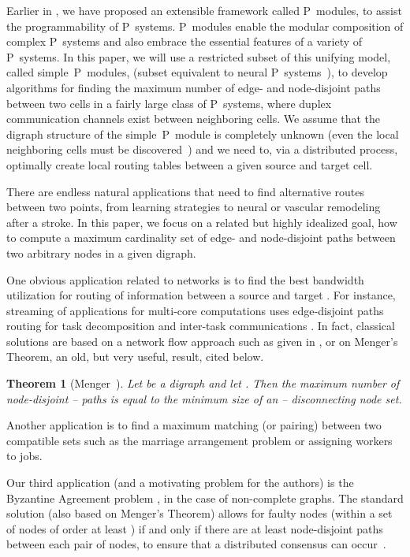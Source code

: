 \documentclass[preliminary,copyright,creativecommons]{eptcs}
\newtheorem{theorem}{Theorem}
\theoremstyle{remark}
\begin{document}
Earlier in \cite{DKN-JLAP2010}, we have proposed an extensible framework 
called P~modules, to assist the programmability of P~systems.
P~modules enable the modular composition of complex P~systems
and also embrace the essential features of a variety of P~systems.
In this paper, we will use a restricted subset of this unifying model,
called simple~P~modules,
(subset equivalent to neural P~systems~\cite{MartinVidePPR2003}),
to develop algorithms for finding the maximum number of edge- and node-disjoint paths
between two cells in a fairly large class of P~systems, where 
duplex communication channels exist between neighboring cells.  
We assume that the digraph structure of the simple~P~module is completely unknown
(even the local neighboring cells must be discovered~\cite{NDK-WMC2009}) 
and we need to, via a distributed process, optimally create local routing tables 
between a given source and target cell.

There are endless natural applications that need to find alternative
routes between two points, from learning strategies to
neural or vascular remodeling after a stroke.
In this paper, we focus on a related but highly idealized goal, 
how to compute a maximum cardinality set of edge- and node-disjoint paths 
between two arbitrary nodes in a given digraph.

One obvious application related to networks is to find the best 
bandwidth utilization for routing of information between a 
source and target \cite{Robacker56}.  
For instance, streaming of applications for multi-core computations 
uses edge-disjoint paths routing for task decomposition and inter-task
communications \cite{SeoT-IPDPS2009}.
In fact, classical solutions are based on a network flow approach such as
given in \cite{FordF1956,EdmondsK1972}, 
or on Menger's Theorem, an old, but very useful, result, cited below.

\begin{theorem}[Menger~\cite{Menger1927}]
Let  be a digraph and let . 
Then the maximum number of node-disjoint -- paths is equal 
to the minimum size of an -- disconnecting node set.
\end{theorem}

Another application is to find a maximum matching (or pairing) 
between two compatible sets such as the marriage arrangement problem or 
assigning workers to jobs.

Our third application (and a motivating problem for the authors) 
is the Byzantine Agreement problem \cite{DKN-JLAP2010,DKN-CMC2010},
in the case of non-complete graphs.
The standard solution (also based on Menger's Theorem) allows for  faulty 
nodes (within a set of nodes of order at least ) if and only if there
are at least  node-disjoint paths between each pair of nodes, 
to ensure that a distributed consensus can occur~\cite{Lynch1996}.
\end{document}
